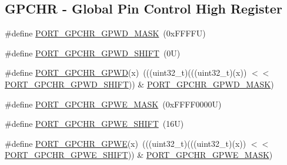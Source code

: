 \subsection*{G\+P\+C\+HR -\/ Global Pin Control High Register}
\begin{DoxyCompactItemize}
\item 
\#define \mbox{\hyperlink{group___p_o_r_t___register___masks_ga4f288d1140184d41384f459c263d6e63}{P\+O\+R\+T\+\_\+\+G\+P\+C\+H\+R\+\_\+\+G\+P\+W\+D\+\_\+\+M\+A\+SK}}~(0x\+F\+F\+F\+F\+U)
\item 
\#define \mbox{\hyperlink{group___p_o_r_t___register___masks_gab4464bb98b737fbf75d42682fef3c09c}{P\+O\+R\+T\+\_\+\+G\+P\+C\+H\+R\+\_\+\+G\+P\+W\+D\+\_\+\+S\+H\+I\+FT}}~(0\+U)
\item 
\#define \mbox{\hyperlink{group___p_o_r_t___register___masks_ga47cddb6551f05cf4810b6f7d96084540}{P\+O\+R\+T\+\_\+\+G\+P\+C\+H\+R\+\_\+\+G\+P\+WD}}(x)~(((uint32\+\_\+t)(((uint32\+\_\+t)(x)) $<$$<$ \mbox{\hyperlink{group___p_o_r_t___register___masks_gab4464bb98b737fbf75d42682fef3c09c}{P\+O\+R\+T\+\_\+\+G\+P\+C\+H\+R\+\_\+\+G\+P\+W\+D\+\_\+\+S\+H\+I\+FT}})) \& \mbox{\hyperlink{group___p_o_r_t___register___masks_ga4f288d1140184d41384f459c263d6e63}{P\+O\+R\+T\+\_\+\+G\+P\+C\+H\+R\+\_\+\+G\+P\+W\+D\+\_\+\+M\+A\+SK}})
\item 
\#define \mbox{\hyperlink{group___p_o_r_t___register___masks_ga5e60b77e9d69fc09654c8034e31df7b5}{P\+O\+R\+T\+\_\+\+G\+P\+C\+H\+R\+\_\+\+G\+P\+W\+E\+\_\+\+M\+A\+SK}}~(0x\+F\+F\+F\+F0000\+U)
\item 
\#define \mbox{\hyperlink{group___p_o_r_t___register___masks_gacbc69d159ff1e697736d296bbc95566d}{P\+O\+R\+T\+\_\+\+G\+P\+C\+H\+R\+\_\+\+G\+P\+W\+E\+\_\+\+S\+H\+I\+FT}}~(16\+U)
\item 
\#define \mbox{\hyperlink{group___p_o_r_t___register___masks_gac451ecefadd3d10c690199acf0540d6f}{P\+O\+R\+T\+\_\+\+G\+P\+C\+H\+R\+\_\+\+G\+P\+WE}}(x)~(((uint32\+\_\+t)(((uint32\+\_\+t)(x)) $<$$<$ \mbox{\hyperlink{group___p_o_r_t___register___masks_gacbc69d159ff1e697736d296bbc95566d}{P\+O\+R\+T\+\_\+\+G\+P\+C\+H\+R\+\_\+\+G\+P\+W\+E\+\_\+\+S\+H\+I\+FT}})) \& \mbox{\hyperlink{group___p_o_r_t___register___masks_ga5e60b77e9d69fc09654c8034e31df7b5}{P\+O\+R\+T\+\_\+\+G\+P\+C\+H\+R\+\_\+\+G\+P\+W\+E\+\_\+\+M\+A\+SK}})
\end{DoxyCompactItemize}
